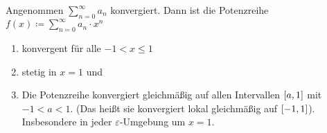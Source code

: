 \begin{satz} %
    \label{satz:abel-grenzwert}
    Angenommen $\displaystyle \sum_{n=0}^{\infty} a_n$ konvergiert. Dann ist die Potenzreihe $\displaystyle f(x) \coloneqq\sum_{n=0}^{\infty} a_n\cdot x^n$
    \begin{enumerate}[label=(\roman*)]
        \item konvergent für alle $-1 < x \leq 1$
        \item stetig in $x=1$ und
        \item Die Potenzreihe konvergiert gleichmäßig auf allen Intervallen $\left[a, 1\right]$ mit $-1 < a < 1$. (Das heißt sie konvergiert lokal gleichmäßig auf $\left[-1, 1\right]$). Insbesondere in jeder $\varepsilon$-Umgebung um $x=1$.
    \end{enumerate}


\end{satz}
